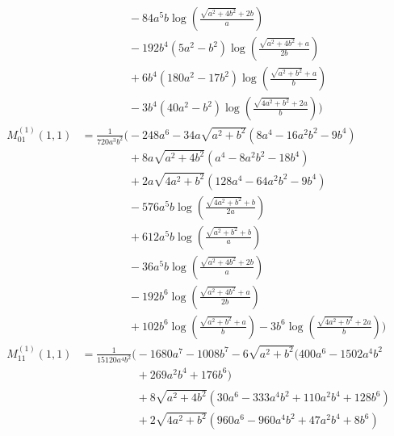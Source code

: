 \begin{align*}
&\phantom{{}=\frac{1}{720 a^{3} b^{2}}\Bigg(}- 84 a^{5} b \log\left(\frac{\sqrt{a^{2} + 4 b^{2}} + 2 b}{a}\right)\\
&\phantom{{}=\frac{1}{720 a^{3} b^{2}}\Bigg(}- 192 b^{4} \left(5 a^{2} - b^{2}\right) \log\left(\frac{\sqrt{a^{2} + 4 b^{2}} + a}{2 b}\right)\\
&\phantom{{}=\frac{1}{720 a^{3} b^{2}}\Bigg(}+ 6 b^{4} \left(180 a^{2} - 17 b^{2}\right) \log\left(\frac{\sqrt{a^{2} + b^{2}} + a}{b}\right)\\
&\phantom{{}=\frac{1}{720 a^{3} b^{2}}\Bigg(}- 3 b^{4} \left(40 a^{2} - b^{2}\right) \log\left(\frac{\sqrt{4 a^{2} + b^{2}} + 2 a}{b}\right)\Bigg)\\[1.2ex]
M^{(1)}_{01}(1,1) &= \frac{1}{720 a^{3} b^{2}}\Bigg(- 248 a^{6} - 34 a \sqrt{a^{2} + b^{2}}\left(8 a^{4} - 16 a^{2} b^{2} - 9 b^{4}\right)\\
&\phantom{{}=\frac{1}{720 a^{3} b^{2}}\Bigg(}+ 8 a \sqrt{a^{2} + 4 b^{2}}\left(a^{4} - 8 a^{2} b^{2} - 18 b^{4}\right)\\
&\phantom{{}=\frac{1}{720 a^{3} b^{2}}\Bigg(}+ 2 a \sqrt{4 a^{2} + b^{2}}\left(128 a^{4} - 64 a^{2} b^{2} - 9 b^{4}\right)\\
&\phantom{{}=\frac{1}{720 a^{3} b^{2}}\Bigg(}- 576 a^{5} b \log\left(\frac{\sqrt{4 a^{2} + b^{2}} + b}{2 a}\right)\\
&\phantom{{}=\frac{1}{720 a^{3} b^{2}}\Bigg(}+ 612 a^{5} b \log\left(\frac{\sqrt{a^{2} + b^{2}} + b}{a}\right)\\
&\phantom{{}=\frac{1}{720 a^{3} b^{2}}\Bigg(}- 36 a^{5} b \log\left(\frac{\sqrt{a^{2} + 4 b^{2}} + 2 b}{a}\right)\\
&\phantom{{}=\frac{1}{720 a^{3} b^{2}}\Bigg(}- 192 b^{6} \log\left(\frac{\sqrt{a^{2} + 4 b^{2}} + a}{2 b}\right)\\
&\phantom{{}=\frac{1}{720 a^{3} b^{2}}\Bigg(}+ 102 b^{6} \log\left(\frac{\sqrt{a^{2} + b^{2}} + a}{b}\right) - 3 b^{6} \log\left(\frac{\sqrt{4 a^{2} + b^{2}} + 2 a}{b}\right)\Bigg)\\[1.2ex]
M^{(1)}_{11}(1,1) &= \frac{1}{15120 a^{4} b^{2}}\Bigg(- 1680 a^{7} - 1008 b^{7} - 6 \sqrt{a^{2} + b^{2}}\bigl(400 a^{6} - 1502 a^{4} b^{2}\\
&\phantom{{}=\frac{1}{15120 a^{4} b^{2}}\Bigg(}+ 269 a^{2} b^{4} + 176 b^{6}\bigr)\\
&\phantom{{}=\frac{1}{15120 a^{4} b^{2}}\Bigg(}+ 8 \sqrt{a^{2} + 4 b^{2}}\left(30 a^{6} - 333 a^{4} b^{2} + 110 a^{2} b^{4} + 128 b^{6}\right)\\
&\phantom{{}=\frac{1}{15120 a^{4} b^{2}}\Bigg(}+ 2 \sqrt{4 a^{2} + b^{2}}\left(960 a^{6} - 960 a^{4} b^{2} + 47 a^{2} b^{4} + 8 b^{6}\right)\\

\end{align*}
